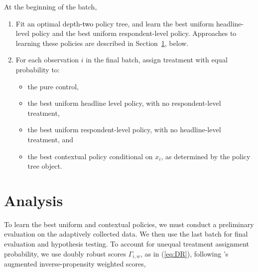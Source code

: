 \documentclass[letterpaper, 12pt, parskip=full,DIV=10]{scrartcl}
\begin{document}
\begin{enumerate}
At the beginning of the batch, 
\begin{enumerate}
  \item Fit an optimal depth\textcolor{black}{-two} policy tree, and learn the best uniform headline-level policy and the best uniform respondent-level policy. Approaches to learning these policies are described in Section~\ref{analysis}, below. 
  \item For each observation $i$ in the final batch, assign treatment with equal probability to:\label{step:policies}
  \begin{itemize}
  \item the pure control, 
  \item the best uniform headline level policy, with no respondent-level treatment, 
  \item the best uniform respondent-level policy, with no headline-level treatment, and
  \item the best contextual policy conditional on $x_i$, as determined by the policy tree object. 
  \end{itemize}
\end{enumerate}
\end{enumerate}


\section{Analysis}\label{analysis}

To learn the best uniform and contextual policies, we must conduct a preliminary evaluation on the adaptively collected data. We then use the last batch for final evaluation and hypothesis testing. To account for unequal treatment assignment probability, we use doubly robust scores $\Gamma_{i,w}$, as in (\ref{eq:DR}), following \cite{robins1994estimation}'s augmented inverse-propensity weighted scores, 
\end{document}
